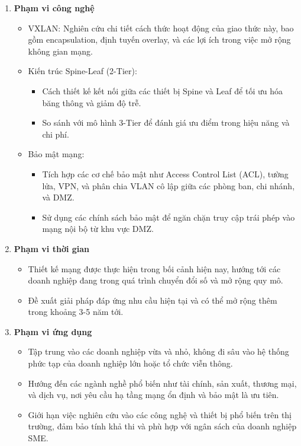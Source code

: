 \documentclass[13pt]{article}
\begin{document}
\begin{enumerate}
    \item \textbf{Phạm vi công nghệ}
    \begin{itemize}
        \item VXLAN: Nghiên cứu chi tiết cách thức hoạt động của giao thức này, bao gồm encapsulation, định tuyến overlay, và các lợi ích trong việc mở rộng không gian mạng.
        \item Kiến trúc Spine-Leaf (2-Tier):
        \begin{itemize}
            \item Cách thiết kế kết nối giữa các thiết bị Spine và Leaf để tối ưu hóa băng thông và giảm độ trễ.
            \item So sánh với mô hình 3-Tier để đánh giá ưu điểm trong hiệu năng và chi phí.
        \end{itemize}
        \item Bảo mật mạng:
        \begin{itemize}
            \item Tích hợp các cơ chế bảo mật như Access Control List (ACL), tường lửa, VPN, và phân chia VLAN cô lập giữa các phòng ban, chi nhánh, và DMZ.
            \item Sử dụng các chính sách bảo mật để ngăn chặn truy cập trái phép vào mạng nội bộ từ khu vực DMZ.
        \end{itemize}
    \end{itemize}

    \item \textbf{Phạm vi thời gian}
    \begin{itemize}
        \item Thiết kế mạng được thực hiện trong bối cảnh hiện nay, hướng tới các doanh nghiệp đang trong quá trình chuyển đổi số và mở rộng quy mô.
        \item Đề xuất giải pháp đáp ứng nhu cầu hiện tại và có thể mở rộng thêm trong khoảng 3-5 năm tới.
    \end{itemize}

    \item \textbf{Phạm vi ứng dụng}
    \begin{itemize}
        \item Tập trung vào các doanh nghiệp vừa và nhỏ, không đi sâu vào hệ thống phức tạp của doanh nghiệp lớn hoặc tổ chức viễn thông.
        \item Hướng đến các ngành nghề phổ biến như tài chính, sản xuất, thương mại, và dịch vụ, nơi yêu cầu hạ tầng mạng ổn định và bảo mật là ưu tiên.
        \item Giới hạn việc nghiên cứu vào các công nghệ và thiết bị phổ biến trên thị trường, đảm bảo tính khả thi và phù hợp với ngân sách của doanh nghiệp SME.
    \end{itemize}
\end{enumerate}
\end{document}
